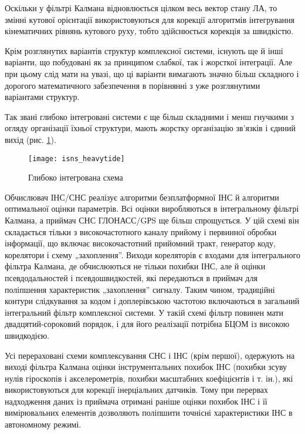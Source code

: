 Оскільки у фільтрі Калмана відновлюється цілком весь вектор стану ЛА, то  змінні 
кутової орієнтації використовуються для корекції алгоритмів інтегрування кінематичних 
рівнянь кутового руху, тобто здійснюється корекція за швидкістю. 

Крім розглянутих варіантів структур комплексної системи, існують ще й інші варіанти, 
що побудовані як за принципом слабкої, так і жорсткої інтеграції. Але при цьому слід 
мати на увазі, що ці варіанти вимагають значно більш складного і дорогого математичного 
забезпечення в порівнянні з уже розглянутими варіантами структур.  

Так звані глибоко інтегровані системи є ще більш складними і менш гнучкими з огляду 
організації їхньої структури, мають жорстку організацію зв'язків і єдиний вихід (рис. 
\ref{fig:isns_heavytide}). 

\begin{figure}[here]
\centering
\texttt{[image: isns\_heavytide]}
\caption{Глибоко інтегрована схема}
\label{fig:isns_heavytide}
\end{figure}

Обчислювач ІНС/СНС реалізує алгоритми безплатформної ІНС й алгоритми оптимальної 
оцінки параметрів. Всі оцінки виробляються в інтегральному фільтрі Калмана, а приймач 
СНС ГЛОНАСС/GРS ще більш спрощується. У цій схемі він складається тільки з високочастотного 
каналу прийому і первинної обробки інформації, що включає високочастотний прийомний 
тракт, генератор коду, корелятори і схему „захоплення''. Виходи кореляторів є входами 
для інтегрального фільтра Калмана, де обчислюються не тільки похибки ІНС, але й оцінки 
псевдодальностей і псевдошвидкостей, які передаються в приймач для поліпшення характеристик 
„захоплення'' сигналу. Таким чином, традиційні контури слідкування за кодом і доплерівською 
частотою включаються в загальний інтегральний фільтр комплексної системи. У такій 
схемі фільтр повинен мати двадцятий-сороковий порядок, і для його реалізації потрібна 
БЦОМ із високою швидкодією.

Усі перераховані схеми комплексування СНС і ІНС (крім першої), одержують на виході 
фільтра Калмана оцінки інструментальних похибок ІНС (похибки зсуву нулів гіроскопів 
і акселерометрів, похибки масштабних коефіцієнтів і т. ін.), які використовуються 
для корекції інерціальних датчиків. Тому при перервах надходження даних із приймача 
отримані раніше оцінки похибок ІНС і її вимірювальних елементів дозволяють поліпшити 
точнісні характеристики ІНС в автономному режимі.


